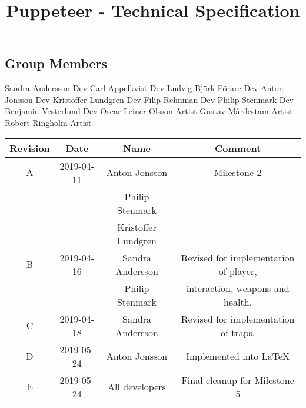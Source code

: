 \documentclass[11pt]{article}
\title{Puppeteer - Technical Specification}
\begin{document}
\maketitle

\vspace*{\fill}

\subsection*{Group Members}
\hspace*{\fill}
\newline Sandra Andersson \hfill Dev
\newline Carl Appelkvist \hfill Dev
\newline Ludvig Björk Förare \hfill Dev
\newline Anton Jonsson \hfill Dev
\newline Kristoffer Lundgren \hfill Dev
\newline Filip Rehnman \hfill Dev
\newline Philip Stenmark \hfill Dev
\newline Benjamin Vesterlund \hfill Dev
\newline Oscar Leiner Olsson \hfill Artist
\newline Gustav Mårdestam \hfill Artist
\newline Robert Ringholm \hfill Artist
\newline
\hspace*{\fill}

\begin{center}
\begin{tabular}{|c|c|c|c|} 
\hline
Revision & Date & Name & Comment \\
\hline
A & 2019-04-11 & Anton Jonsson & Milestone 2 \\ 
&&   Philip Stenmark &\\
&& Kristoffer Lundgren &\\
\hline
B & 2019-04-16 & Sandra Andersson & Revised for implementation of player,\\ 
&&   Philip Stenmark & interaction, weapons and health. \\
\hline
C & 2019-04-18 & Sandra Andersson & Revised for implementation of traps. \\
\hline
D & 2019-05-24 & Anton Jonsson & Implemented into \LaTeX \\
\hline
E & 2019-05-24 & All developers & Final cleanup for Milestone 5 \\
\hline
\end{tabular}
\end{center}
\end{document}
